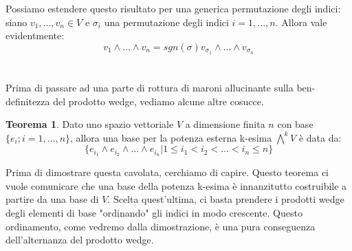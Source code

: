 \documentclass[12pt,a4paper]{report}
\theoremstyle{definition}
\theoremstyle{Theorem}
\newtheorem{Theo}[Def]{Teorema}
\theoremstyle{definition}
\theoremstyle{definition}
\theoremstyle{definition}
\begin{document}
	\\
	\\
	Possiamo estendere questo risultato per una generica permutazione degli indici: siano $v_1,...,v_n\in V$ e $\sigma_i$ una permutazione degli indici $i=1,...,n$. Allora vale evidentmente:
	$$v_1\wedge...\wedge v_n=sgn(\sigma)v_{\sigma_1}\wedge...\wedge v_{\sigma_n}$$ \\
	\\
	Prima di passare ad una parte di rottura di maroni allucinante sulla ben-definitezza del prodotto wedge, vediamo alcune altre cosucce.
	\begin{Theo}
		Dato uno spazio vettoriale $V$ a dimensione finita $n$ con base $\{e_i; i=1,...,n\}$, allora una base per la potenza esterna k-esima $\bigwedge^k V$ è data da:
		$$\{e_{i_1}\wedge e_{i_2}\wedge...\wedge e_{i_n}|1\leq i_1 < i_2 <... < i_n \leq n\}$$ 
	\end{Theo}
	Prima di dimostrare questa cavolata, cerchiamo di capire. Questo teorema ci vuole comunicare che una base della potenza k-esima è innanzitutto costruibile a partire da una base di $V$. Scelta quest'ultima, ci basta prendere i prodotti wedge degli elementi di base "ordinando" gli indici in modo crescente. Questo ordinamento, come vedremo dalla dimostrazione, è una pura conseguenza dell'alternanza del prodotto wedge.\\
\end{document}
